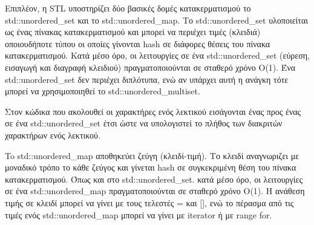 Επιπλέον, η STL υποστηρίζει δύο βασικές δομές κατακερματισμού το std::unordered\_set και το std::unordered\_map. Το std::unordered\_set υλοποιείται ως ένας πίνακας κατακερματισμού και μπορεί να περιέχει τιμές (κλειδιά) οποιουδήποτε τύπου οι οποίες γίνονται hash σε διάφορες θέσεις του πίνακα κατακερματισμού. Κατά μέσο όρο, οι λειτουργίες σε ένα std::unordered\_set (εύρεση, εισαγωγή και διαγραφή κλειδιού) πραγματοποιούνται σε σταθερό χρόνο O(1). Ένα std::unordered\_set δεν περιέχει διπλότυπα, ενώ αν υπάρχει αυτή η ανάγκη τότε μπορεί να χρησιμοποιηθεί το std::unordered\_multiset. 

Στον κώδικα που ακολουθεί οι χαρακτήρες ενός λεκτικού εισάγονται ένας προς ένας σε ένα std::unordered\_set έτσι ώστε να υπολογιστεί το πλήθος των διακριτών χαρακτήρων ενός λεκτικού.





To std::unordered\_map αποθηκεύει ζεύγη (κλειδί-τιμή). Το κλειδί αναγνωριζει με μοναδικό τρόπο το κάθε ζεύγος και γίνεται hash σε συγκεκριμένη θέση του πίνακα κατακερματισμού. Όπως και στο std::unordered\_set. κατά μέσο όρο, οι λειτουργίες σε ένα std::unordered\_map πραγματοποιούνται σε σταθερό χρόνο O(1). Η ανάθεση τιμής σε κλειδί μπορεί να γίνει με τους τελεστές = και [], ενώ το πέρασμα από τις τιμές ενός std::unordered\_map μπορεί να γίνει με  iterator ή με range for.
 




%

